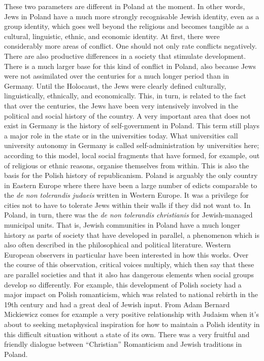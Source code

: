These two parameters are different in Poland at the moment. In other words, Jews in Poland have a much more strongly recognisable Jewish identity, even as a group identity, which goes well beyond the religious and becomes tangible as a cultural, linguistic, ethnic, and economic identity. At first, there were considerably more areas of conflict. One should not only rate conflicts negatively. There are also productive differences in a society that stimulate development. There is a much larger base for this kind of conflict in Poland, also because Jews were not assimilated over the centuries for a much longer period than in Germany. Until the Holocaust, the Jews were clearly defined culturally, linguistically, ethnically, and economically. This, in turn, is related to the fact that over the centuries, the Jews have been very intensively involved in the political and social history of the country. A very important area that does not exist in Germany is the history of self-government in Poland. This term still plays a major role in the state or in the universities today. What universities call university autonomy in Germany is called self-administration by universities here; according to this model, local social fragments that have formed, for example, out of religious or ethnic reasons, organise themselves from within. This is also the basis for the Polish history of republicanism. Poland is arguably the only country in Eastern Europe where there have been a large number of edicts comparable to the \textit{de non tolerandis judaeis} written in Western Europe. It was a privilege for cities not to have to tolerate Jews within their walls if they did not want to. In Poland, in turn, there was the \textit{de non tolerandis christianis} for Jewish-managed municipal units. That is, Jewish communities in Poland have a much longer history as parts of society that have developed in parallel, a phenomenon which is also often described in the philosophical and political literature. Western European observers in particular have been interested in how this works. Over the course of this observation, critical voices multiply, which then say that these are parallel societies and that it also has dangerous elements when social groups develop so differently. For example, this development of Polish society had a major impact on Polish romanticism, which was related to national rebirth in the 19th century and had a great deal of Jewish input. From Adam Bernard Mickiewicz comes for example a very positive relationship with Judaism when it's about to seeking metaphysical inspiration for how to maintain a Polish identity in this difficult situation without a state of its own. There was a very fruitful and friendly dialogue between ``Christian'' Romanticism and Jewish traditions in Poland. \\
